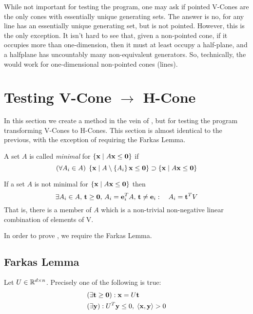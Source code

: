 \begin{Remark}
	While not important for testing the program, one may ask if pointed V-Cones are the only cones with essentially unique generating sets.  The answer is no, for any line has an essentially unique generating set, but is not pointed.  However, this is the only exception.  It isn't hard to see that, given a non-pointed cone, if it occupies more than one-dimension, then it must at least occupy a half-plane, and a halfplane has uncountably many non-equivalent generators.  So, technically, the  would work for one-dimensional non-pointed cones (lines).
\end{Remark}

\section{Testing V-Cone $\to$ H-Cone}

In this section we create a method in the vein of , but for testing the program transforming V-Cones to H-Cones.  This section is almost identical to the previous, with the exception of requiring the Farkas Lemma.

\begin{Def}
	A set $A$ is called \textit{minimal} for $\left\{\mathbf{x}\;|\; A\mathbf{x}\leq\mathbf{0}\right\}$ if
	\[ (\forall A_i \in A)\; \left\{\mathbf{x}\;|\; A\setminus\left\{A_i\right\}\mathbf{x}\leq\mathbf{0}\right\} \supset \left\{\mathbf{x}\;|\; A\mathbf{x}\leq\mathbf{0}\right\} \]
\end{Def}

\begin{Prop}\label{a_not_minimal}
	If a set $A$ is not minimal for $\left\{\mathbf{x}\;|\; A\mathbf{x}\leq\mathbf{0}\right\}$ then
	\[\exists A_i\in A,\, \mathbf{t}\geq\mathbf{0},\, A_i=\mathbf{e}_i^T A,\,\mathbf{t}\neq\mathbf{e}_i:\quad A_i = \mathbf{t}^T V \]
	That is, there is a member of $A$ which is a non-trivial non-negative linear combination of elements of V.
\end{Prop}

In order to prove , we require the Farkas Lemma.

\subsection{Farkas Lemma}

\begin{Prop}\label{farkas_lemma}
	Let $U \in \mathbb{R}^{d\times n}$.  Precisely one of the following is true:
	\begin{align*}
		 & (\exists \mathbf{t} \geq \mathbf{0}) : \mathbf{x} = U\mathbf{t}                \\
		 & (\exists \mathbf{y}) : U^T\mathbf{y} \leq 0,\; \left\langle \mathbf{x}, \mathbf{y} \right\rangle > 0
	\end{align*}
\end{Prop}

